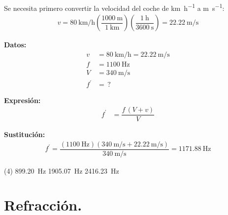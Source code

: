 \documentclass[12pt]{exam}
\begin{document}
\begin{questions}
    \vspace*{0.3cm}
    Se necesita primero convertir la velocidad del coche de \unit{\kilo\meter\per\hour} a \unit{\meter\per\second}:
    \begin{align*}
    v = \SI[per-mode=fraction]{80}{\kilo\meter\per\hour} \left( \dfrac{\SI{1000}{\meter}}{\SI{1}{\kilo\meter}} \right) \left( \dfrac{\SI{1}{\hour}}{\SI{3600}{\second}} \right) = \SI[per-mode=fraction]{22.22}{\meter\per\second}
    \end{align*}
    
    \vspace*{0.3cm}
    \begin{minipage}[t]{0.35\linewidth}
    \textbf{Datos: }
    \begin{align*}
    v &= \SI{80}{\kilo\meter\per\hour} = \SI{22.22}{\meter\per\second} \\
    f &= \SI{1100}{\hertz} \\
    V &= \SI{340}{\meter\per\second} \\
    f^{\prime} &= \, ?
    \end{align*}
    \end{minipage}
    \hspace{1cm}
    \begin{minipage}[t]{0.4\linewidth}
    \textbf{Expresión:}
    \begin{align*}
    f^{\prime} &= \dfrac{f \, (V + v)}{V}
    \end{align*}
    \end{minipage}

    \vspace*{0.3cm}
    \textbf{Sustitución:}
    \begin{align*}
    f^{\prime} = \dfrac{\left( \SI{1100}{\hertz} \right)\left( \displaystyle \SI[per-mode=fraction]{340}{\meter\per\second} + \SI[per-mode=fraction]{22.22}{\meter\per\second} \right)}{\displaystyle \SI[per-mode=fraction]{340}{\meter\per\second}} = \SI{1171.88}{\hertz}
    \end{align*}

    \begin{tasks}(4)
        \task \SI{899.20}{\hertz}
        \task {}
        \task \SI{1905.07}{\hertz}
        \task \SI{2416.23}{\hertz}
    \end{tasks}

    \newpage

    \setcounter{section}{5}
    \section{Refracción.}


\end{questions}
\end{document}
